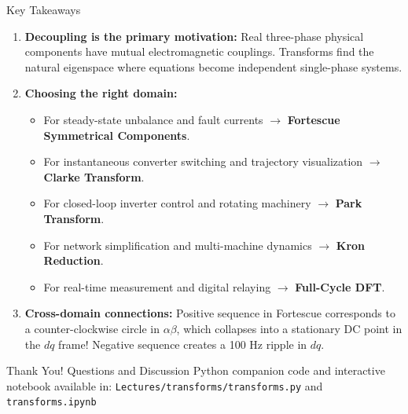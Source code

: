 \begin{frame}[allowframebreaks]{Key Takeaways}
    \begin{enumerate}
        \item \textbf{Decoupling is the primary motivation:} Real three-phase physical components have mutual electromagnetic couplings. Transforms find the natural eigenspace where equations become independent single-phase systems.
        \item \textbf{Choosing the right domain:}
        \begin{itemize}
            \item For steady-state unbalance and fault currents $\to$ \textbf{Fortescue Symmetrical Components}.
            \item For instantaneous converter switching and trajectory visualization $\to$ \textbf{Clarke Transform}.
            \item For closed-loop inverter control and rotating machinery $\to$ \textbf{Park Transform}.
            \item For network simplification and multi-machine dynamics $\to$ \textbf{Kron Reduction}.
            \item For real-time measurement and digital relaying $\to$ \textbf{Full-Cycle DFT}.
        \end{itemize}
        \item \textbf{Cross-domain connections:}
        Positive sequence in Fortescue corresponds to a counter-clockwise circle in $\alpha\beta$, which collapses into a stationary DC point in the $dq$ frame! Negative sequence creates a 100 Hz ripple in $dq$.
    \end{enumerate}
\end{frame}

\begin{frame}
    \centering
    \Huge Thank You!
    \vfill
    \large Questions and Discussion
    \vfill
    \small Python companion code and interactive notebook available in:
    \texttt{Lectures/transforms/transforms.py} and \texttt{transforms.ipynb}
\end{frame}

